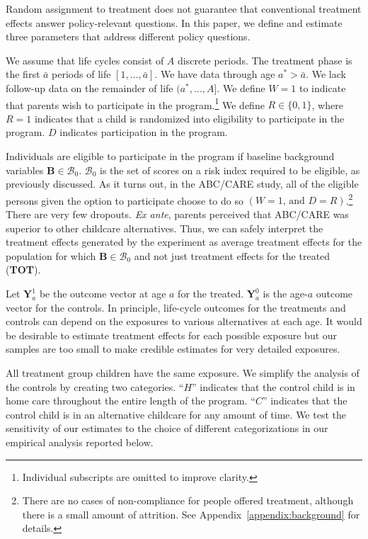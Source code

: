 Random assignment to treatment does not guarantee that conventional treatment effects answer policy-relevant questions. In this paper, we define and estimate three parameters that address different policy questions.

We assume that life cycles consist of $A$ discrete periods. The treatment phase is the first $\bar{a}$ periods of life $\left[1,\dots,\bar{a}\right]$. We have data through age $a^{*}>\bar{a}$. We lack follow-up data on the remainder of life $(a^*,\dots,A]$. We define $W=1$ to indicate that parents wish to participate in the program.\footnote{Individual subscripts are omitted to improve clarity.} We define $R \in \{0,1\}$, where $R=1$ indicates that a child is randomized into eligibility to participate in the program. $D$ indicates participation in the program.

Individuals are eligible to participate in the program if baseline background variables $\bm{B}\in\mathcal{B}_0$. $\mathcal{B}_0$ is the set of scores on a risk index required to be eligible, as previously discussed. As it turns out, in the ABC/CARE study, all of the eligible persons given the option to participate choose to do so $(W=1\text{, and } D=R)$.\footnote{There are no cases of non-compliance for people offered treatment, although there is a small amount of attrition. See Appendix~\ref{appendix:background} for details.} There are very few dropouts. \emph{Ex ante}, parents perceived that ABC/CARE was superior to other childcare alternatives. Thus, we can safely interpret the treatment effects generated by the experiment as average treatment effects for the population for which $\bm{B}\in\mathcal{B}_0$ and not just treatment effects for the treated (\textbf{TOT}).

Let $\bm{Y}^1_a$ be the outcome vector at age $a$ for the treated. $\bm{Y}^0_a$ is the age-$a$ outcome vector for the controls. In principle, life-cycle outcomes for the treatments and controls can depend on the exposures to various alternatives at each age. It would be desirable to estimate treatment effects for each possible exposure but our samples are too small to make credible estimates for very detailed exposures.

All treatment group children have the same exposure. We simplify the analysis of the controls by creating two categories. ``$H$'' indicates that the control child is in home care throughout the entire length of the program. ``$C$'' indicates that the control child is in an alternative childcare for any amount of time. We test the sensitivity of our estimates to the choice of different categorizations in our empirical analysis reported below.

